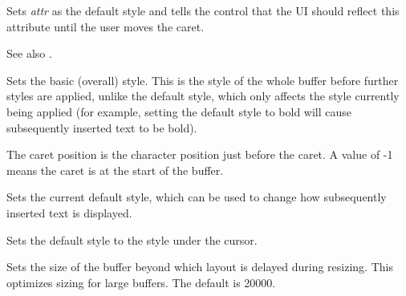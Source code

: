 \label{wxrichtextctrlsetandshowdefaultstyle}


Sets {\it attr} as the default style and tells the control that the UI should reflect
this attribute until the user moves the caret.

See also .

\label{wxrichtextctrlsetbasicstyle}


Sets the basic (overall) style. This is the style of the whole
buffer before further styles are applied, unlike the default style, which
only affects the style currently being applied (for example, setting the default
style to bold will cause subsequently inserted text to be bold).

\label{wxrichtextctrlsetcaretposition}


The caret position is the character position just before the caret.
A value of -1 means the caret is at the start of the buffer.

\label{wxrichtextctrlsetdefaultstyle}


Sets the current default style, which can be used to change how subsequently inserted
text is displayed.

\label{wxrichtextctrlsetdefaultstyletocursorstyle}


Sets the default style to the style under the cursor.

\label{wxrichtextctrlsetdelayedlayoutthreshold}


Sets the size of the buffer beyond which layout is delayed during resizing.
This optimizes sizing for large buffers. The default is 20000.

